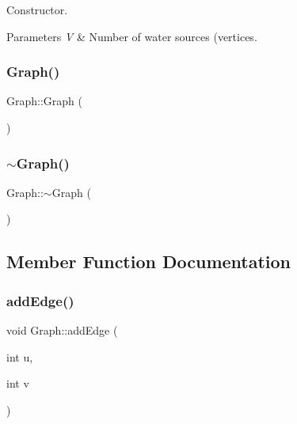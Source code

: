 Constructor. 
\begin{DoxyParams}{Parameters}
{\em V} & Number of water sources (vertices. \\
\hline
\end{DoxyParams}
\mbox{\label{classGraph_ae4c72b8ac4d693c49800a4c7e273654f_ae4c72b8ac4d693c49800a4c7e273654f}} 
\subsubsection{\texorpdfstring{Graph()}{Graph()}\hspace{0.1cm}{\footnotesize\ttfamily [2/2]}}
{\footnotesize\ttfamily Graph\+::\+Graph (\begin{DoxyParamCaption}{ }\end{DoxyParamCaption})}

\mbox{\label{classGraph_a902c5b3eacb66d60752525ab23297a95_a902c5b3eacb66d60752525ab23297a95}} 
\subsubsection{\texorpdfstring{$\sim$\+Graph()}{~Graph()}}
{\footnotesize\ttfamily Graph\+::$\sim$\+Graph (\begin{DoxyParamCaption}{ }\end{DoxyParamCaption})\hspace{0.3cm}{\ttfamily [virtual]}}



\subsection{Member Function Documentation}
\mbox{\label{classGraph_ad8c10df34357b2cd865c81e0c4f0bd8c_ad8c10df34357b2cd865c81e0c4f0bd8c}} 
\subsubsection{\texorpdfstring{add\+Edge()}{addEdge()}}
{\footnotesize\ttfamily void Graph\+::add\+Edge (\begin{DoxyParamCaption}\item[{int}]{u,  }\item[{int}]{v }\end{DoxyParamCaption})}

